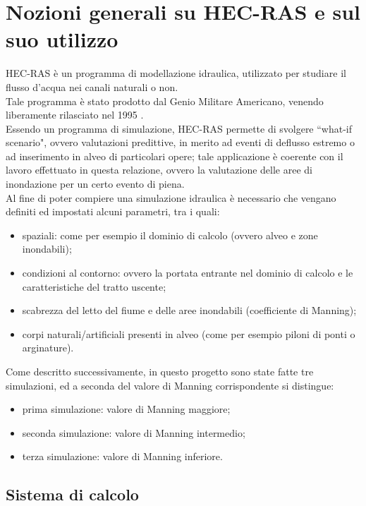 \section{Nozioni generali su HEC-RAS e sul suo utilizzo}
HEC-RAS è un programma di modellazione idraulica, utilizzato per studiare il flusso d'acqua nei canali naturali o non.\\
Tale programma è stato prodotto dal Genio Militare Americano, venendo liberamente rilasciato nel 1995 \cite{hec-ras}.\\
Essendo un programma di simulazione, HEC-RAS permette di svolgere ``what-if scenario", ovvero valutazioni predittive, in merito ad eventi di deflusso estremo o ad inserimento in alveo di particolari opere; tale applicazione è coerente con il lavoro effettuato in questa relazione, ovvero la valutazione delle aree di inondazione per un certo evento di piena.\\
Al fine di poter compiere una simulazione idraulica è necessario che vengano definiti ed impostati alcuni parametri, tra i quali:
\begin{itemize}
    \item spaziali: come per esempio il dominio di calcolo (ovvero alveo e zone inondabili);
    \item condizioni al contorno: ovvero la portata entrante nel dominio di calcolo e le caratteristiche del tratto uscente;
    \item scabrezza del letto del fiume e delle aree inondabili (coefficiente di Manning);
    \item corpi naturali/artificiali presenti in alveo (come per esempio piloni di ponti o arginature).
\end{itemize}

Come descritto successivamente, in questo progetto sono state fatte tre simulazioni, ed a seconda del valore di Manning corrispondente si distingue:
\begin{itemize}
    \item prima simulazione: valore di Manning maggiore;
    \item seconda simulazione: valore di Manning intermedio;
    \item terza simulazione: valore di Manning inferiore.
\end{itemize}

\subsection{Sistema di calcolo}

